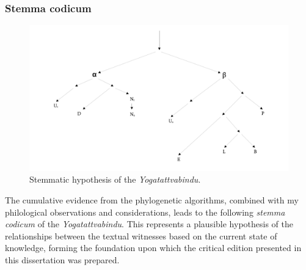 \subsubsection{Stemma codicum}

\begin{figure}[H]
    \centering
    \includegraphics[width=1\textwidth]{pics/stemma.pdf} %
    \caption{Stemmatic hypothesis of the \emph{Yogatattvabindu}.}
    \label{fig:stemma}
\end{figure}

The cumulative evidence from the phylogenetic algorithms, combined with my philological observations and considerations, leads to the following \textit{stemma codicum} of the \emph{Yogatattvabindu}. This represents a plausible hypothesis of the relationships between the textual witnesses based on the current state of knowledge, forming the foundation upon which the critical edition presented in this dissertation was prepared.




